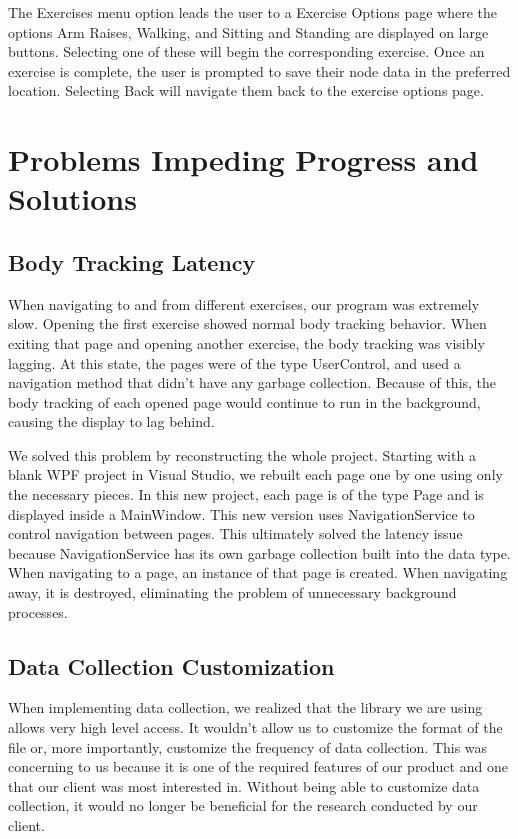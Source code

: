 \documentclass[onecolumn, draftclsnofoot,10pt, compsoc]{IEEEtran}
\begin{document}
The Exercises menu option leads the user to a Exercise Options page where the options Arm Raises, Walking, and Sitting and Standing are displayed on large buttons. Selecting one of these will begin the corresponding exercise. Once an exercise is complete, the user is prompted to save their node data in the preferred location. Selecting Back will navigate them back to the exercise options page. 

\section{Problems Impeding Progress and Solutions}
\subsection{Body Tracking Latency}
When navigating to and from different exercises, our program was extremely slow. Opening the first exercise showed normal body tracking behavior. When exiting that page and opening another exercise, the body tracking was visibly lagging. At this state, the pages were of the type UserControl, and used a navigation method that didn't have any garbage collection. Because of this, the body tracking of each opened page would continue to run in the background, causing the display to lag behind.

We solved this problem by reconstructing the whole project. Starting with a blank WPF project in Visual Studio, we rebuilt each page one by one using only the necessary pieces. In this new project, each page is of the type Page and is displayed inside a MainWindow. This new version uses NavigationService to control navigation between pages. This ultimately solved the latency issue because NavigationService has its own garbage collection built into the data type. When navigating to a page, an instance of that page is created. When navigating away, it is destroyed, eliminating the problem of unnecessary background processes.

\subsection{Data Collection Customization}
When implementing data collection, we realized that the library we are using allows very high level access. It wouldn't allow us to customize the format of the file or, more importantly, customize the frequency of data collection. This was concerning to us because it is one of the required features of our product and one that our client was most interested in. Without being able to customize data collection, it would no longer be beneficial for the research conducted by our client.
\end{document}
